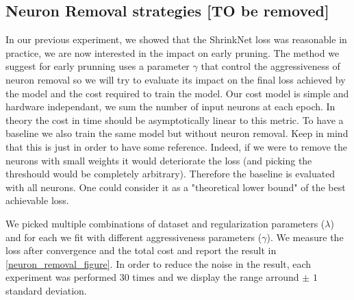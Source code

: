 \subsection{Neuron Removal strategies [TO be removed]}

In our previous experiment, we showed that the ShrinkNet loss was
reasonable in practice, we are now interested in the impact on
early pruning. The method we suggest for early prunning uses a
parameter $\gamma$ that control the aggressiveness of neuron removal
so we will try to evaluate its impact on the final loss achieved by
the model and the cost required to train the model. Our cost model
is simple and hardware independant, we sum the number of input neurons
at each epoch. In theory the cost in time should be asymptotically
linear to this metric. To have a baseline we also train the same model
but without neuron removal. Keep in mind that this is just in order to
have some reference. Indeed, if we were to remove the neurons with small
weights it would deteriorate the loss (and picking the threshould would
be completely arbitrary). Therefore the baseline is evaluated with all neurons.
One could consider it as a "theoretical lower bound" of the best achievable loss.


We picked multiple combinations of dataset and regularization parameters ($\lambda$) and for each we fit with different aggressiveness parameters ($\gamma$). We measure the loss after convergence and the total cost and report the result in \cref{neuron_removal_figure}. In order to reduce the noise in the result, each experiment was performed $30$ times and we display the range arround $\pm$ $1$ standard deviation.
